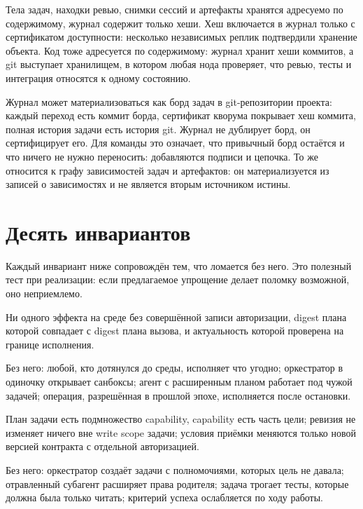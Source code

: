 Тела задач, находки ревью, снимки сессий и артефакты хранятся адресуемо по содержимому, журнал содержит только хеши. Хеш включается в журнал только с сертификатом доступности: несколько независимых реплик подтвердили хранение объекта. Код тоже адресуется по содержимому: журнал хранит хеши коммитов, а git выступает хранилищем, в котором любая нода проверяет, что ревью, тесты и интеграция относятся к одному состоянию.

Журнал может материализоваться как борд задач в git-репозитории проекта: каждый переход есть коммит борда, сертификат кворума покрывает хеш коммита, полная история задачи есть история git. Журнал не дублирует борд, он сертифицирует его. Для команды это означает, что привычный борд остаётся и что ничего не нужно переносить: добавляются подписи и цепочка. То же относится к графу зависимостей задач и артефактов: он материализуется из записей о зависимостях и не является вторым источником истины.

\section{Десять инвариантов}

Каждый инвариант ниже сопровождён тем, что ломается без него. Это полезный тест при реализации: если предлагаемое упрощение делает поломку возможной, оно неприемлемо.

\begin{invbox}
Ни одного эффекта на среде без совершённой записи авторизации, digest плана которой совпадает с digest плана вызова, и актуальность которой проверена на границе исполнения.

Без него: любой, кто дотянулся до среды, исполняет что угодно; оркестратор в одиночку открывает санбоксы; агент с расширенным планом работает под чужой задачей; операция, разрешённая в прошлой эпохе, исполняется после остановки.
\end{invbox}

\begin{invbox}
План задачи есть подмножество capability, capability есть часть цели; ревизия не изменяет ничего вне write scope задачи; условия приёмки меняются только новой версией контракта с отдельной авторизацией.

Без него: оркестратор создаёт задачи с полномочиями, которых цель не давала; отравленный субагент расширяет права родителя; задача трогает тесты, которые должна была только читать; критерий успеха ослабляется по ходу работы.
\end{invbox}

